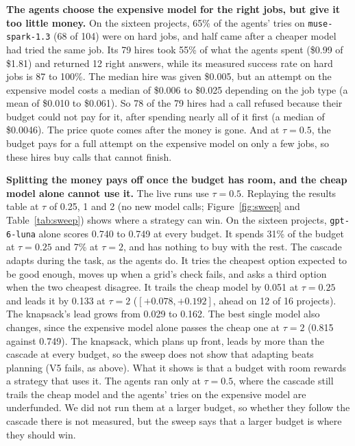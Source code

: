 \textbf{The agents choose the expensive model for the right jobs, but give it too little money.} On the sixteen
projects, 65\% of the agents' tries on \texttt{muse-spark-1.3} (68 of 104) were on hard jobs, and half came after a
cheaper model had tried the same job. Its 79 hires took 55\% of what the agents spent (\$0.99 of \$1.81) and returned 12
right answers, while its measured success rate on hard jobs is 87 to 100\%. The median hire was given \$0.005, but an
attempt on the expensive model costs a median of \$0.006 to \$0.025 depending on the job type (a mean of \$0.010 to
\$0.061). So 78 of the 79 hires had a call refused because their budget could not pay for it, after spending nearly all
of it first (a median of \$0.0046). The price quote comes after the money is gone. And at $\tau = 0.5$, the budget pays
for a full attempt on the expensive model on only a few jobs, so these hires buy calls that cannot finish.

\textbf{Splitting the money pays off once the budget has room, and the cheap model alone cannot use it.} The live runs
use $\tau = 0.5$. Replaying the results table at $\tau$ of 0.25, 1 and 2 (no new model calls; Figure~\ref{fig:sweep}
and Table~\ref{tab:sweep}) shows where a strategy can win. On the sixteen projects, \texttt{gpt-6-luna} alone scores
0.740 to 0.749 at every budget. It spends 31\% of the budget at $\tau = 0.25$ and 7\% at $\tau = 2$, and has nothing to
buy with the rest. The cascade adapts during the task, as the agents do. It tries the cheapest option expected to be
good enough, moves up when a grid's check fails, and asks a third option when the two cheapest disagree. It trails the
cheap model by 0.051 at $\tau = 0.25$ and leads it by 0.133 at $\tau = 2$ ($[+0.078, +0.192]$, ahead on 12 of 16
projects). The knapsack's lead grows from 0.029 to 0.162. The best single model also changes, since the expensive model
alone passes the cheap one at $\tau = 2$ (0.815 against 0.749). The knapsack, which plans up front, leads by more than
the cascade at every budget, so the sweep does not show that adapting beats planning (V5 fails, as above). What it
shows is that a budget with room rewards a strategy that uses it. The agents ran only at $\tau = 0.5$, where the
cascade still trails the cheap model and the agents' tries on the expensive model are underfunded. We did not run them
at a larger budget, so whether they follow the cascade there is not measured, but the sweep says that a larger budget is
where they should win.

